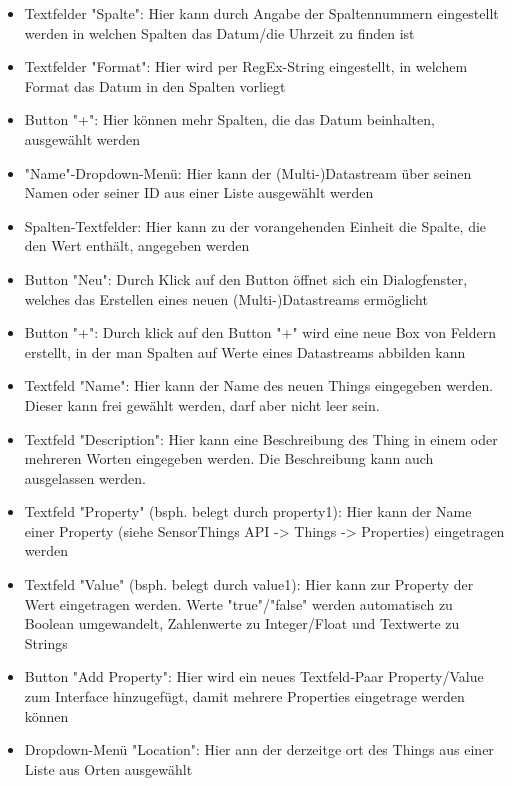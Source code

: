 \documentclass[12 pt]{article}
\begin{document}
\begin{itemize}
\item Textfelder "Spalte": Hier kann durch Angabe der Spaltennummern eingestellt werden in welchen Spalten das Datum/die Uhrzeit zu finden ist
\item Textfelder "Format": Hier wird per RegEx-String eingestellt, in welchem Format das Datum in den Spalten vorliegt
\item Button "+": Hier können mehr Spalten, die das Datum beinhalten, ausgewählt werden

\item "Name"-Dropdown-Menü: Hier kann der (Multi-)Datastream über seinen Namen oder seiner ID aus einer Liste ausgewählt werden
\item Spalten-Textfelder: Hier kann zu der vorangehenden Einheit die Spalte, die den Wert enthält, angegeben werden
\item Button "Neu": Durch Klick auf den Button öffnet sich ein Dialogfenster, welches das Erstellen eines neuen (Multi-)Datastreams ermöglicht
\item Button "+": Durch klick auf den Button "+" wird eine neue Box von Feldern erstellt, in der man Spalten auf Werte eines Datastreams abbilden kann

\item Textfeld "Name": Hier kann der Name des neuen Things eingegeben werden. Dieser kann frei gewählt werden, darf aber nicht leer sein.
\item Textfeld "Description": Hier kann eine Beschreibung des Thing in einem oder mehreren Worten eingegeben werden. Die Beschreibung kann auch ausgelassen werden.
\item Textfeld "Property" (bsph. belegt durch property1): Hier kann der Name einer Property (siehe SensorThings API -> Things -> Properties) eingetragen werden
\item Textfeld "Value" (bsph. belegt durch value1): Hier kann zur Property der Wert eingetragen werden. Werte "true"/"false" werden automatisch zu Boolean umgewandelt, Zahlenwerte zu Integer/Float und Textwerte zu Strings
\item Button "Add Property": Hier wird ein neues Textfeld-Paar Property/Value zum Interface hinzugefügt, damit mehrere Properties eingetrage werden können
\item Dropdown-Menü "Location": Hier ann der derzeitge ort des Things aus einer Liste aus Orten ausgewählt
\end{itemize}


\end{document}
